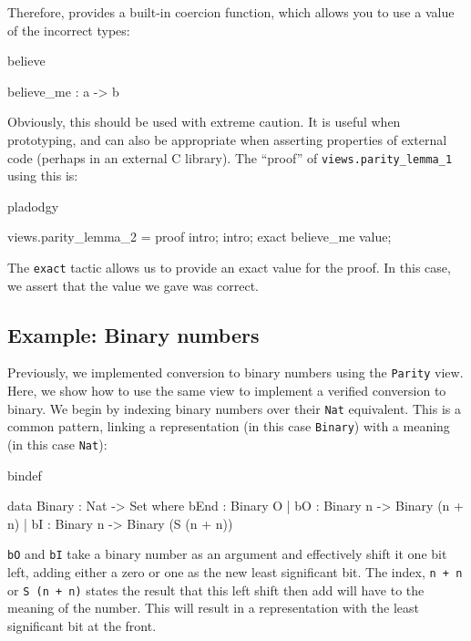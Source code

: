 Therefore, \Idris{} provides a built-in coercion function, which allows you to use
a value of the incorrect types:

\begin{SaveVerbatim}{believe}

believe_me : a -> b 

\end{SaveVerbatim}

\noindent
Obviously, this should be used with extreme caution. It is useful when prototyping, and
can also be appropriate when asserting properties of external code (perhaps in an
external C library). The ``proof'' of \texttt{views.parity\_lemma\_1} using this is:

\begin{SaveVerbatim}{pladodgy}

views.parity_lemma_2 = proof {
    intro;
    intro;
    exact believe_me value;
}

\end{SaveVerbatim}

\noindent
The \texttt{exact} tactic allows us to provide an exact value for the proof. In this case,
we assert that the value we gave was correct.

\subsection{Example: Binary numbers}

Previously, we implemented conversion to binary numbers using the \texttt{Parity} view.
Here, we show how to use the same view to implement a verified conversion to
binary.
We begin by indexing binary numbers over their \texttt{Nat} equivalent. This is a common
pattern, linking a representation (in this case \texttt{Binary}) with a meaning (in this
case \texttt{Nat}):

\begin{SaveVerbatim}{bindef}

data Binary : Nat -> Set where
   bEnd : Binary O
 | bO : Binary n -> Binary (n + n)
 | bI : Binary n -> Binary (S (n + n))

\end{SaveVerbatim}

\noindent
\texttt{bO} and \texttt{bI} take a binary number as an argument and effectively shift it one bit
left, adding either a zero or one as the new least significant bit. The index,
\texttt{n + n} or \texttt{S (n + n)} states the result that this left shift then add will
have to the meaning of the number. This will result in a representation with
the least significant bit at the front.

